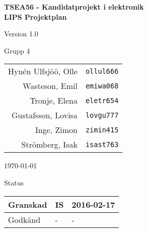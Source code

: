 \documentclass[11pt]{article}
\begin{document}
\begin{titlepage}
\begin{center}

{\Large\bfseries TSEA56 - Kandidatprojekt i elektronik \\ LIPS Projektplan}

\vspace{5em}

Version 1.0

\vspace{5em}
Grupp 4 \\
\begin{tabular}{rl}
Hynén Ulfsjöö, Olle&\verb+ollul666+
\\
Wasteson, Emil&\verb+emiwa068+
\\
Tronje, Elena&\verb+eletr654+
\\
Gustafsson, Lovisa&\verb+lovgu777+
\\
Inge, Zimon&\verb+zimin415+
\\
Strömberg, Isak&\verb+isast763+
\\
\end{tabular}

\vspace{5em}
\today

\vspace{16em}
Status
\begin{longtable}{|l|l|l|} \hline

Granskad & IS & 2016-02-17 \\ \hline
Godkänd & - & - \\ \hline
 
\end{longtable}

\end{center}
\end{titlepage}
\end{document}
